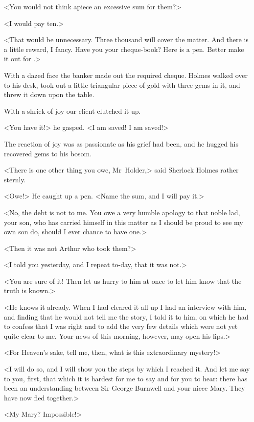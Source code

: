 <You would not think  apiece an excessive sum for them?>

<I would pay ten.>

<That would be unnecessary. Three thousand will cover the matter. And there is a little reward, I fancy. Have you your cheque-book? Here is a pen. Better make it out for .>

With a dazed face the banker made out the required cheque. Holmes walked over to his desk, took out a little triangular piece of gold with three gems in it, and threw it down upon the table.

With a shriek of joy our client clutched it up.

<You have it!> he gasped. <I am saved! I am saved!>

The reaction of joy was as passionate as his grief had been, and he hugged his recovered gems to his bosom.

<There is one other thing you owe, Mr~Holder,> said Sherlock Holmes rather sternly.

<Owe!> He caught up a pen. <Name the sum, and I will pay it.>

<No, the debt is not to me. You owe a very humble apology to that noble lad, your son, who has carried himself in this matter as I should be proud to see my own son do, should I ever chance to have one.>

<Then it was not Arthur who took them?>

<I told you yesterday, and I repeat to-day, that it was not.>

<You are sure of it! Then let us hurry to him at once to let him know that the truth is known.>

<He knows it already. When I had cleared it all up I had an interview with him, and finding that he would not tell me the story, I told it to him, on which he had to confess that I was right and to add the very few details which were not yet quite clear to me. Your news of this morning, however, may open his lips.>

<For Heaven's sake, tell me, then, what is this extraordinary mystery!>

<I will do so, and I will show you the steps by which I reached it. And let me say to you, first, that which it is hardest for me to say and for you to hear: there has been an understanding between Sir George Burnwell and your niece Mary. They have now fled together.>

<My Mary? Impossible!>

